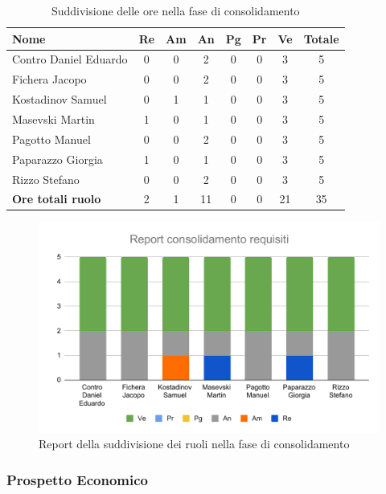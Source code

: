 \documentclass[../piano_di_progetto.tex]{subfiles}
\begin{document}
\begin{table}[!ht]

	\centering
	\begin{tabular}{|l|c|c|c|c|c|c|c|}
	\hline
	\rowcolor{lightgray}
	\textbf{Nome} & \textbf{Re} & \textbf{Am} & \textbf{An} & \textbf{Pg}  & \textbf{Pr}   & \textbf{Ve} & \textbf{Totale} \\
	\hline
		Contro Daniel Eduardo & 0 & 0 & 2 & 0 & 0 & 3  & 5 \\
		Fichera Jacopo & 0 & 0 & 2 & 0 & 0 & 3 & 5 \\
		Kostadinov Samuel & 0 & 1 & 1 & 0 & 0 & 3 & 5 \\			
		Masevski Martin & 1 & 0 & 1 & 0 & 0 & 3 & 5 \\
		Pagotto Manuel & 0 & 0 & 2 & 0 & 0 & 3 & 5 \\			
		Paparazzo Giorgia & 1 & 0 & 1 & 0 & 0 & 3 & 5 \\
		Rizzo Stefano & 0 & 0 & 2 & 0 & 0 & 3 & 5 \\
		\hline
		\textbf{Ore totali ruolo} & 2 & 1 & 11 & 0 & 0 & 21 & 35 \\
	\hline	
	\end{tabular}
	\caption{Suddivisione delle ore nella fase di consolidamento}
\end{table}

\begin{figure}[H]
\centering
\includegraphics[width=12cm]{src/img/report/report_consolidamento.pdf}
\caption{Report della suddivisione dei ruoli nella fase di consolidamento}
\end{figure}

\subsubsection{Prospetto Economico}
\end{document}
